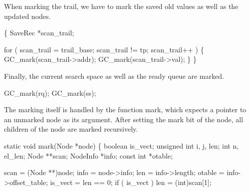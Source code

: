 \nwendcode{}\nwdocspar
When marking the trail, we have to mark the saved old values as well
as the updated nodes.

\nwenddocs{}\plusendmoddef\nwstartdeflinemarkup{}\nwenddeflinemarkup
\{
    SaveRec *scan_trail;

    for ( scan_trail = trail_base; scan_trail != tp; scan_trail++ )
    \{
        GC_mark(scan_trail->addr);
        GC_mark(scan_trail->val);
    \}
\}

\nwendcode{}\nwdocspar
Finally, the current search space as well as the ready queue are marked.

\nwenddocs{}\plusendmoddef\nwstartdeflinemarkup{}\nwenddeflinemarkup
GC_mark(rq);
GC_mark(ss);

\nwendcode{}\nwdocspar
The marking itself is handled by the function {\Tt{}mark\nwendquote}, which expects
a pointer to an unmarked node as its argument. After setting the mark
bit of the node, all children of the node are marked recursively.

\nwenddocs{}\plusendmoddef\nwstartdeflinemarkup{}\nwenddeflinemarkup
static void
mark(Node *node)
\{
    boolean      is_vect;
    unsigned int i, j, len;
    int          n, el_len;
    Node         **scan;
    NodeInfo     *info;
    const int    *otable;

    scan    = (Node **)node;
    info    = node->info;
    len     = info->length;
    otable  = info->offset_table;
    is_vect = len == 0;
    if ( is_vect )
        len = (int)scan[1];

